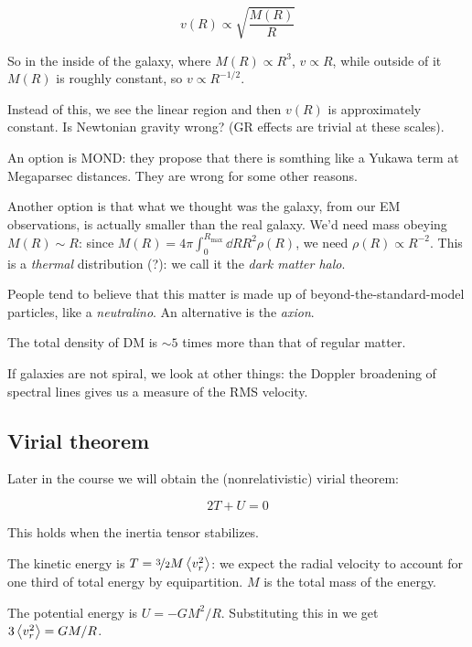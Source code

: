 \documentclass[main.tex]{subfiles}
\begin{document}
\begin{equation}
  v(R) \propto \sqrt{\frac{M(R)}{R}}
\end{equation}

So in the inside of the galaxy, where \(M(R) \propto R^3\), \(v \propto R\), while outside of it \(M(R)\) is roughly constant, so \(v \propto R^{-1/2}\).

Instead of this, we see the linear region and then \(v(R)\) is approximately constant. Is Newtonian gravity wrong? (GR effects are trivial at these scales).

An option is MOND: they propose that there is somthing like a Yukawa term at Megaparsec distances. They are wrong for some other reasons.

Another option is that what we thought was the galaxy, from our EM observations, is actually smaller than the real galaxy. We'd need mass obeying \(M (R) \sim R\): since \(M(R) = 4 \pi \int_0^{R_{\text{max}}} \dd{R} R^2 \rho(R)\), we need \(\rho(R) \propto R^{-2}\). This is a \emph{thermal} distribution (?): we call it the \emph{dark matter halo}.

People tend to believe that this matter is made up of beyond-the-standard-model particles, like a \emph{neutralino}.
An alternative is the \emph{axion}.

The total density of DM is \(\sim 5\) times more than that of regular matter.

If galaxies are not spiral, we look at other things: the Doppler broadening of spectral lines gives us a measure of the RMS velocity.

\subsection{Virial theorem}

Later in the course we will obtain the (nonrelativistic) virial theorem:

\begin{equation}
  2T + U = 0
\end{equation}

This holds when the inertia tensor stabilizes.

The kinetic energy is \(T = \frac[i]{3}{2} M \expval{v_r^2} \): we expect the radial velocity to account for one third of total energy by equipartition.
\(M\) is the total mass of the energy.

The potential energy is \(U = - G M^2 /R\). Substituting this in we get \(3 \expval{v_r^2} = GM/R\).
\end{document}
